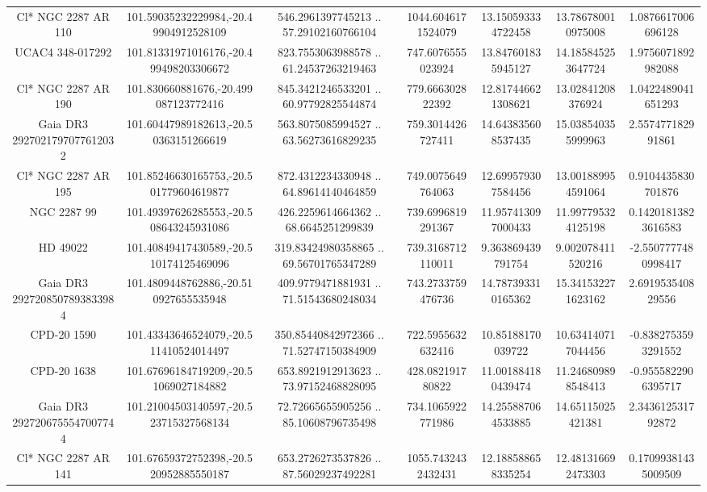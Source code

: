 \begin{table}
\begin{tabular}{ccccccc}
Cl* NGC 2287     AR     110 & 101.59035232229984,-20.49904912528109 & 546.2961397745213 .. 57.29102160766104 & 1044.6046171524079 & 13.150593334722458 & 13.786780010975008 & 1.0876617006696128 \\
UCAC4 348-017292 & 101.81331971016176,-20.499498203306672 & 823.7553063988578 .. 61.24537263219463 & 747.6076555023924 & 13.847601835945127 & 14.185845253647724 & 1.9756071892982088 \\
Cl* NGC 2287     AR     190 & 101.830660881676,-20.499087123772416 & 845.3421246533201 .. 60.97792825544874 & 779.666302822392 & 12.817446621308621 & 13.02841208376924 & 1.0422489041651293 \\
Gaia DR3 2927021797077612032 & 101.60447989182613,-20.50363151266619 & 563.8075085994527 .. 63.56273616829235 & 759.3014426727411 & 14.643835608537435 & 15.038540355999963 & 2.557477182991861 \\
Cl* NGC 2287     AR     195 & 101.85246630165753,-20.501779604619877 & 872.4312234330948 .. 64.89614140464859 & 749.0075649764063 & 12.699579307584456 & 13.001889954591064 & 0.9104435830701876 \\
NGC  2287    99 & 101.49397626285553,-20.508643245931086 & 426.2259614664362 .. 68.6645251299839 & 739.6996819291367 & 11.957413097000433 & 11.997795324125198 & 0.14201813823616583 \\
HD  49022 & 101.40849417430589,-20.510174125469096 & 319.83424980358865 .. 69.56701765347289 & 739.3168712110011 & 9.363869439791754 & 9.002078411520216 & -2.5507777480998417 \\
Gaia DR3 2927208507893833984 & 101.4809448762886,-20.510927655535948 & 409.9779471881931 .. 71.51543680248034 & 743.2733759476736 & 14.787393310165362 & 15.341532271623162 & 2.691953540829556 \\
CPD-20  1590 & 101.43343646524079,-20.511410524014497 & 350.85440842972366 .. 71.52747150384909 & 722.5955632632416 & 10.85188170039722 & 10.634140717044456 & -0.8382753593291552 \\
CPD-20  1638 & 101.67696184719209,-20.51069027184882 & 653.8921912913623 .. 73.97152468828095 & 428.082191780822 & 11.001884180439474 & 11.246809898548413 & -0.9555822906395717 \\
Gaia DR3 2927206755547007744 & 101.21004503140597,-20.523715327568134 & 72.72665655905256 .. 85.10608796735498 & 734.1065922771986 & 14.255887064533885 & 14.65115025421381 & 2.343612531792872 \\
Cl* NGC 2287     AR     141 & 101.67659372752398,-20.520952885550187 & 653.2726273537826 .. 87.56029237492281 & 1055.7432432432431 & 12.188588658335254 & 12.481316692473303 & 0.17099381435009509 \\

\end{tabular}
\end{table}
